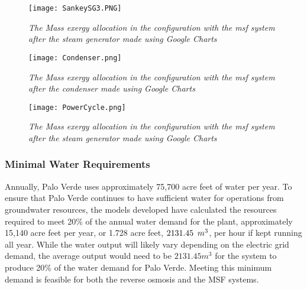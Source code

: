 \begin{figure*}[h!]
\centering
\texttt{[image: SankeySG3.PNG]}
\caption{\small \sl The Mass exergy allocation in the configuration with the \ac{msf} system after the steam generator made using Google Charts}
\label{SankeySG}
\centering
\end{figure*}

\begin{figure*}[h!]
\centering
\texttt{[image: Condenser.png]}
\caption{\small \sl The Mass exergy allocation in the configuration with the \ac{msf} system after the condenser made using Google Charts}
\label{SankeyC}
\centering
\end{figure*}
\begin{figure*}[h!]
\centering
\texttt{[image: PowerCycle.png]}
\caption{\small \sl The Mass exergy allocation in the configuration with the \ac{msf} system after the steam generator made using Google Charts}
\label{SankeyPC}
\centering
\end{figure*}
\clearpage

\subsubsection{Minimal Water Requirements}
Annually, Palo Verde uses approximately 75,700 acre feet of water per year.  To ensure that Palo Verde continues to have sufficient water for operations from groundwater resources, the models developed have calculated the resources required to meet 20\% of the annual water demand for the plant, approximately 15,140 acre feet per year, or 1.728 acre feet, $2131.45 \hspace{.17 cm} m^3$, per hour if kept running all year. While the water output will likely vary depending on the electric grid demand, the average output would need to be $2131.45 m^3$ for the system to produce 20\% of the water demand for Palo Verde. Meeting this minimum demand is feasible for both the reverse osmosis and the MSF systems.

